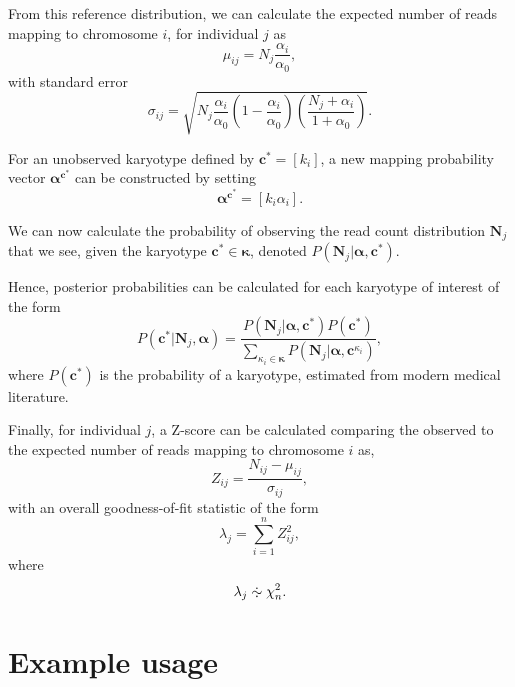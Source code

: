 \documentclass[10pt,a4paper]{article}
\newcommand{\apprsim}{%
  \mathrel{\ooalign{\hss$\sim$\hss\cr
                    \hidewidth\raise0.65ex\hbox{$\cdot$}\hidewidth\cr
                    \hidewidth\lower0.65ex\hbox{$\cdot$}\hidewidth}}%
}
\begin{document}
From this reference distribution, we can calculate the expected number of reads mapping to chromosome $i$, for individual $j$ as
\begin{equation*}
    \mu_{ij} = N_{j}\dfrac{\alpha_i}{\alpha_0},
\end{equation*}
with standard error
\begin{equation*}
    \sigma_{ij} = \sqrt{N_j\dfrac{\alpha_i}{\alpha_0}\left(1-\dfrac{\alpha_i}{\alpha_0} \right) \left(\dfrac{N_j + \alpha_i}{1 + \alpha_0} \right)}.
\end{equation*}

For an unobserved karyotype defined by $\bm{c}^* = \left[k_i\right]$, a new mapping probability vector $\bm{\alpha}^{\bm{c}^*}$ can be constructed by setting
\begin{equation*}
    \bm{\alpha}^{\bm{c}^*} = \left[ k_i \alpha_i \right].
\end{equation*}

We can now calculate the probability of observing the read count distribution $\bm{N}_j$ that we see, given the karyotype $\bm{c}^* \in \bm{\kappa}$, denoted $P\left( \bm{N}_j \big\vert \bm{\alpha}, \bm{c}^* \right)$.

Hence, posterior probabilities can be calculated for each karyotype of interest of the form
\begin{equation*}
    P\left(\bm{c}^*\big\vert \bm{N}_j,\bm{\alpha}\right) = \dfrac{P\left( \bm{N}_j \big\vert \bm{\alpha}, \bm{c}^* \right)P\left(\bm{c}^* \right)}{\sum_{\kappa_i\in\bm{\kappa}} P\left( \bm{N}_j \big\vert \bm{\alpha}, \bm{c}^{\kappa_i} \right)},
\end{equation*}
where $P\left(\bm{c}^* \right)$ is the probability of a karyotype, estimated from modern medical literature.

Finally, for individual $j$, a Z-score can be calculated comparing the observed to the expected number of reads mapping to chromosome $i$ as,
\begin{equation*}
    Z_{ij} = \dfrac{N_{ij}-\mu_{ij}}{\sigma_{ij}},
\end{equation*}
with an overall goodness-of-fit statistic of the form
\begin{equation*}
    \lambda_{j} = \sum_{i=1}^{n} Z_{ij}^2,
\end{equation*}
where
\begin{equation*}
    \lambda_j \apprsim \chi^2_{n}.
\end{equation*}

\section{Example usage}
\end{document}

